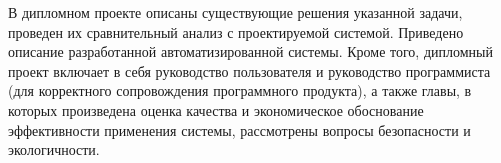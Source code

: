 В дипломном проекте описаны существующие решения указанной задачи, проведен их сравнительный анализ с проектируемой системой. Приведено описание разработанной автоматизированной системы. Кроме того, дипломный проект включает в себя руководство пользователя и руководство программиста (для корректного сопровождения программного продукта), а также главы, в которых произведена оценка качества и экономическое обоснование эффективности применения системы, рассмотрены вопросы безопасности и экологичности.
